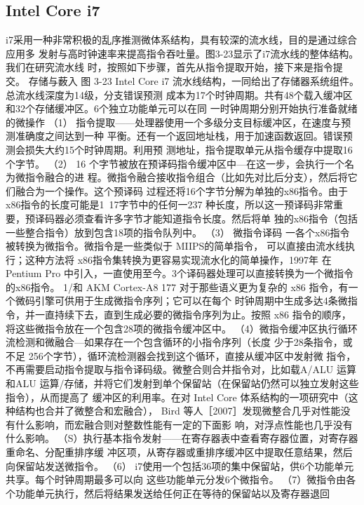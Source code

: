 \subsection{Intel Core i7}
i7采用一种非常积极的乱序推测微体系结构，具有较深的流水线，目的是通过综合应用多
发射与高时钟速率来提高指令吞吐量。图3-23显示了i7流水线的整体结构。我们在研究流水线
时，按照如下步骤，首先从指令提取开始，接下来是指令提交。
存储与薮入
图 3-23
Intel Core i7 流水线结构，一同给出了存储器系统组件。总流水线深度为14级，分支错误预测
成本为17个时钟周期。共有48个载入缓冲区和32个存储缓冲区。6个独立功能单元可以在同
一时钟周期分别开始执行准备就绪的微操作
（1） 指令提取——处理器使用一个多级分支目标缓冲区，在速度与预测准确度之间达到一种
平衡。还有一个返回地址栈，用于加速函数返回。错误预测会损失大约15个时钟周期。利用预
测地址，指令提取单元从指令缓存中提取16个字节。
（2） 16 个字节被放在预译码指令缓冲区中—在这一步，会执行一个名为微指令融合的进
程。微指令融合接收指令组合（比如先对比后分支），然后将它们融合为一个操作。这个预译码
过程还将16个字节分解为单独的x86指令。由于x86指令的长度可能是1~17字节中的任何一237
种长度，所以这一预译码非常重要，预译码器必须查看许多字节才能知道指令长度。然后将单
独的x86指令（包括一些整合指令）放到包含18项的指令队列中。
（3） 微指令译码 一各个x86指令被转换为微指令。微指令是一些类似于 MIIPS的简单指令，
可以直接由流水线执行；这种方法将 x86指令集转换为更容易实现流水化的简单操作，1997年
在 Pentium Pro 中引入，一直使用至今。3个译码器处理可以直接转换为一个微指令的x86指令。
1/和 AKM Cortex-A8
177
对于那些语义更为复杂的 x86 指令，有一个微码引擎可供用于生成微指令序列；它可以在每个
时钟周期中生成多达4条微指令，并一直持续下去，直到生成必要的微指令序列为止。按照 x86
指令的顺序，将这些微指令放在一个包含28项的微指令缓冲区中。
（4）微指令缓冲区执行循环流检测和微融合—如果存在一个包含循环的小指令序列（长度
少于28条指令，或不足 256个字节），循环流检测器会找到这个循环，直接从缓冲区中发射微
指令，不再需要启动指令提取与指令译码级。微整合则合并指令对，比如载A/ALU 运算和ALU
运算/存储，并将它们发射到单个保留站（在保留站仍然可以独立发射这些指令），从而提高了
缓冲区的利用率。在对 Intel Core 体系结构的一项研究中（这种结构也合并了微整合和宏融合），
Bird 等人［2007］发现微整合几乎对性能没有什么影响，而宏融合则对整数性能有一定的下面影
响，对浮点性能也几乎没有什么影响。
（S）执行基本指令发射——在寄存器表中查看寄存器位置，对寄存器重命名、分配重排序缓
冲区项，从寄存器或重排序缓冲区中提取任意结果，然后向保留站发送微指令。
（6） i7使用一个包括36项的集中保留站，供6个功能单元共享。每个时钟周期最多可以向
这些功能单元分发6个微指令。
（7）微指令由各个功能单元执行，然后将结果发送给任何正在等待的保留站以及寄存器退回
